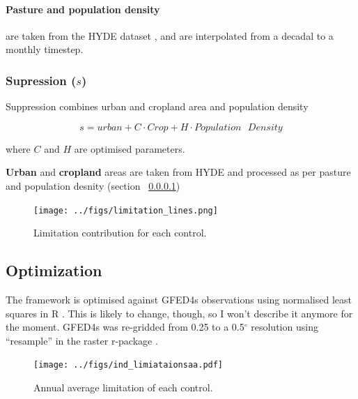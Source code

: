\paragraph{Pasture and population density}
\label{Pasture}
are taken from the HYDE dataset \citep{klein2007mapping}, and are interpolated from a decadal to a monthly timestep.

\subsubsection{Supression ($s$)}

Suppression combines urban and cropland area and population density

\begin{equation}
    s = urban + C \cdot Crop + H \cdot Population\text{ }Density
    \label{equ:Supression}
\end{equation}

where $C$ and $H$ are optimised parameters.

\textbf{Urban} and \textbf{cropland} areas are taken from HYDE and processed as per pasture and population desnity (section ~\ref{Pasture})


\begin{figure}[!ht]
  \centering
    \texttt{[image: ../figs/limitation\_lines.png]}

  \caption{Limitation contribution for each control.}
  \label{fig:lim_lines}
\end{figure}

\subsection{Optimization}

\begin{shaded}
    The framework is optimised against GFED4s observations \citep{Giglio2013}  using normalised least squares in R \citep{rstats}.  This is likely to change, though, so I won't describe it anymore for the moment. GFED4s was re-gridded from 0.25 to a 0.5$^{\circ}$ resolution using ``resample'' in the raster r-package \citep{rraster}.
\end{shaded}

\begin{figure}[!ht]
  \centering
    \texttt{[image: ../figs/ind\_limiataionsaa.pdf]}
  \caption{Annual average limitation of each control.}
  \label{fig:Annual_average_con}
\end{figure}


